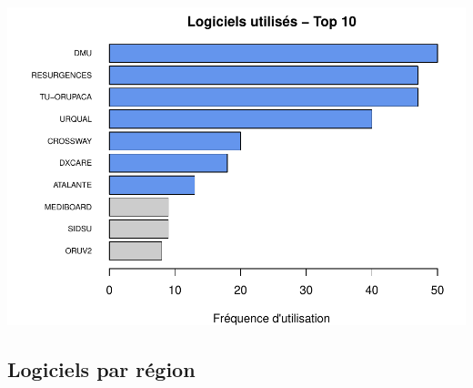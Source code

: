 \documentclass[]{article}
\begin{document}
\includegraphics{septembre2015_files/figure-latex/unnamed-chunk-9-1.pdf}

\subsection{Logiciels par région}\label{logiciels-par-region}
\end{document}

